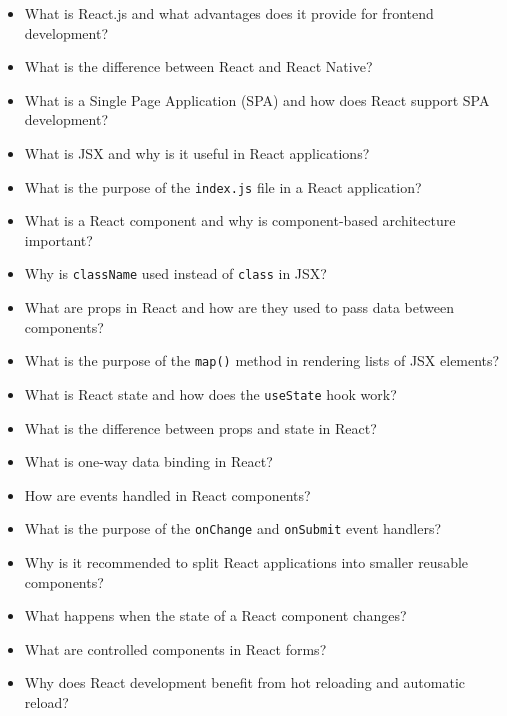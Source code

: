 \begin{itemize}
    \item What is React.js and what advantages does it provide for frontend development?
    
    \item What is the difference between React and React Native?
    
    \item What is a Single Page Application (SPA) and how does React support SPA development?
    
    \item What is JSX and why is it useful in React applications?
    
    \item What is the purpose of the \texttt{index.js} file in a React application?
    
    \item What is a React component and why is component-based architecture important?
    
    \item Why is \texttt{className} used instead of \texttt{class} in JSX?
    
    \item What are props in React and how are they used to pass data between components?
    
    \item What is the purpose of the \texttt{map()} method in rendering lists of JSX elements?
    
    \item What is React state and how does the \texttt{useState} hook work?
    
    \item What is the difference between props and state in React?
    
    \item What is one-way data binding in React?
    
    \item How are events handled in React components?
    
    \item What is the purpose of the \texttt{onChange} and \texttt{onSubmit} event handlers?
    
    \item Why is it recommended to split React applications into smaller reusable components?
    
    \item What happens when the state of a React component changes?
    
    \item What are controlled components in React forms?
    
    \item Why does React development benefit from hot reloading and automatic reload?
\end{itemize}
